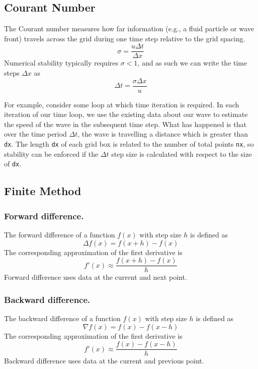 \documentclass[../../../main.tex]{subfiles}
\begin{document}
\subsection{Courant Number}
The Courant number measures how far information (e.g., a fluid particle or wave front) travels across the grid during one time step relative to the grid spacing.
\begin{equation*}
    \sigma=\frac{u \Delta t}{\Delta x}
\end{equation*}
Numerical stability typically requires $\sigma<1$, and as such we can write the time steps $\Delta x$ as 
\begin{equation*}
    \Delta t=\frac{\sigma \Delta x }{u}
\end{equation*}

For example, consider some loop at which time iteration is required.
In each iteration of our time loop, we use the existing data about our wave to estimate the speed of the wave in the subsequent time step.
What has happened is that over the time period $\Delta t$, the wave is travelling a distance which is greater than \verb|dx|.  The length \verb|dx| of each grid box is related to the number of total points \verb|nx|, so stability can be enforced if the $\Delta t$ step size is calculated with respect to the size of \verb|dx|. 
 
\subsection{Finite Method}
\subsubsection{Forward difference.}
The forward difference of a function $f(x)$ with step size $h$ is defined as
\begin{equation*}
    \Delta f(x)=f(x+h)-f(x)
\end{equation*}
The corresponding approximation of the first derivative is
\begin{equation*}
    f'(x)\approx \frac{f(x+h )-f(x )}{h}
\end{equation*}
Forward difference uses data at the current and next point.

\subsubsection{Backward difference.}
The backward difference of a function $f(x)$ with step size $h$ is defined as
\begin{equation*}
    \nabla f(x)=f(x)-f(x-h)
\end{equation*}
The corresponding approximation of the first derivative is
\begin{equation*}
    f'(x)\approx \frac{f(x )-f(x-h )}{h}
\end{equation*}
Backward difference uses data at the current and previous point.
\end{document}
